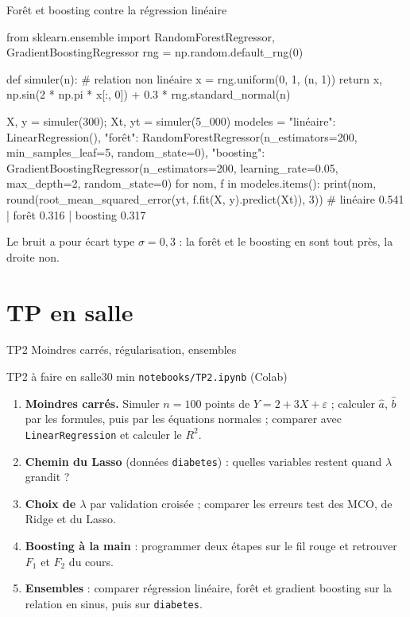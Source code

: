 \documentclass[aspectratio=169,11pt]{beamer}
\begin{document}
\begin{frame}[fragile]{Forêt et boosting contre la régression linéaire}
\begin{python}[basicstyle=\ttfamily\scriptsize]
from sklearn.ensemble import RandomForestRegressor, GradientBoostingRegressor
rng = np.random.default_rng(0)

def simuler(n):                                     # relation non linéaire
    x = rng.uniform(0, 1, (n, 1))
    return x, np.sin(2 * np.pi * x[:, 0]) + 0.3 * rng.standard_normal(n)

X, y = simuler(300); Xt, yt = simuler(5_000)
modeles = {
    "linéaire": LinearRegression(),
    "forêt": RandomForestRegressor(n_estimators=200, min_samples_leaf=5,
                                   random_state=0),
    "boosting": GradientBoostingRegressor(n_estimators=200, learning_rate=0.05,
                                          max_depth=2, random_state=0)}
for nom, f in modeles.items():
    print(nom, round(root_mean_squared_error(yt, f.fit(X, y).predict(Xt)), 3))
# linéaire 0.541 | forêt 0.316 | boosting 0.317
\end{python}
\vskip-1mm
{\small\color{cnfGris}Le bruit a pour écart type $\sigma=0{,}3$ : la forêt et le boosting en sont tout près, la droite non.}
\end{frame}

\section{TP en salle}

\begin{frame}{TP2 \textendash{} Moindres carrés, régularisation, ensembles}
  \footnotesize
  \begin{tp}{TP2 \textendash{} à faire en salle}{30 min \textperiodcentered{} \texttt{notebooks/TP2.ipynb} (Colab)}
    \begin{enumerate}\setlength\itemsep{1pt}
      \item \textbf{Moindres carrés.} Simuler $n=100$ points de $Y=2+3X+\varepsilon$ ; calculer $\hat a$, $\hat b$ par les formules, puis par les équations normales ; comparer avec \texttt{LinearRegression} et calculer le $R^2$.
      \item \textbf{Chemin du Lasso} (données \texttt{diabetes}) : quelles variables restent quand $\lambda$ grandit ?
      \item \textbf{Choix de $\lambda$} par validation croisée ; comparer les erreurs test des MCO, de Ridge et du Lasso.
      \item \textbf{Boosting à la main} : programmer deux étapes sur le fil rouge et retrouver $F_1$ et $F_2$ du cours.
      \item \textbf{Ensembles} : comparer régression linéaire, forêt et gradient boosting sur la relation en sinus, puis sur \texttt{diabetes}.
    \end{enumerate}
  \end{tp}
\end{frame}
\end{document}
